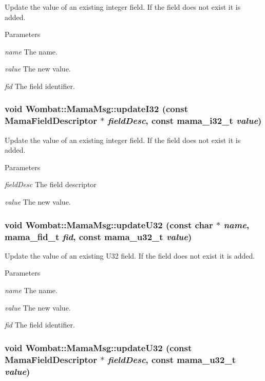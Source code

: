 Update the value of an existing integer field. If the field does not exist it is added.


\begin{DoxyParams}{Parameters}
\item[{\em name}]The name. \item[{\em value}]The new value. \item[{\em fid}]The field identifier. \end{DoxyParams}
\hypertarget{classWombat_1_1MamaMsg_a9917c997e9a274687c13050b3a0485e3}{
\subsubsection[{updateI32}]{\setlength{\rightskip}{0pt plus 5cm}void Wombat::MamaMsg::updateI32 (const {\bf MamaFieldDescriptor} $\ast$ {\em fieldDesc}, \/  const mama\_\-i32\_\-t {\em value})}}
\label{classWombat_1_1MamaMsg_a9917c997e9a274687c13050b3a0485e3}


Update the value of an existing integer field. If the field does not exist it is added.


\begin{DoxyParams}{Parameters}
\item[{\em fieldDesc}]The field descriptor \item[{\em value}]The new value. \end{DoxyParams}
\hypertarget{classWombat_1_1MamaMsg_a2081687a0dee235b801219656cb89d38}{
\subsubsection[{updateU32}]{\setlength{\rightskip}{0pt plus 5cm}void Wombat::MamaMsg::updateU32 (const char $\ast$ {\em name}, \/  mama\_\-fid\_\-t {\em fid}, \/  const mama\_\-u32\_\-t {\em value})}}
\label{classWombat_1_1MamaMsg_a2081687a0dee235b801219656cb89d38}


Update the value of an existing U32 field. If the field does not exist it is added.


\begin{DoxyParams}{Parameters}
\item[{\em name}]The name. \item[{\em value}]The new value. \item[{\em fid}]The field identifier. \end{DoxyParams}
\hypertarget{classWombat_1_1MamaMsg_aed8f745dc934fd0c89cfe12a535eea7b}{
\subsubsection[{updateU32}]{\setlength{\rightskip}{0pt plus 5cm}void Wombat::MamaMsg::updateU32 (const {\bf MamaFieldDescriptor} $\ast$ {\em fieldDesc}, \/  const mama\_\-u32\_\-t {\em value})}}
\label{classWombat_1_1MamaMsg_aed8f745dc934fd0c89cfe12a535eea7b}


